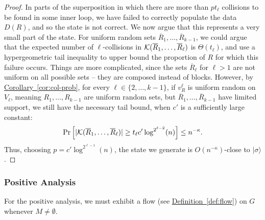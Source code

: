 \documentclass{theoretics}
\newcommand{\cor}[1]{\hyperref[cor:#1]{Corollary~\ref*{cor:#1}}}
\newcommand{\defin}[1]{\hyperref[def:#1]{Definition~\ref*{def:#1}}}
\def\ket#1{{\lvert}#1\rangle}
\renewcommand{\>}{\rangle}
\newcommand{\<}{\langle}
\renewcommand{\(}{\left(}
\renewcommand{\)}{\right)}
\begin{document}
\begin{proof}
In parts of the superposition in which there are more than $pt_{\ell}$ collisions to be found in some inner loop, we have failed to correctly populate the data $D(R)$, and so the state is not correct. We now argue that this represents a very small part of the state. For uniform random sets $\overline{R}_1,\dots,\overline{R}_{k-1}$, we could argue that the expected number of $\ell$-collisions in ${\cal K}(\overline{R}_1,\dots,\overline{R}_{\ell})$ is $\Theta(t_{\ell})$, and use a hypergeometric tail inequality to upper bound the proportion of $R$ for which this failure occurs. Things are more complicated, since the sets $\overline{R}_{\ell}$ for $\ell>1$ are not uniform on all possible sets -- they are composed instead of blocks. However, by \cor{col-prob}, for every $\ell\in \{2,\dots,k-1\}$, if $v_R^{\ell}$ is uniform random on $V_{\ell}$, meaning $R_1,\dots,R_{k-1}$ are uniform random sets, but $\overline{R}_1,\dots,\overline{R}_{k-1}$ have limited support, we still have the necessary tail bound, when $c'$ is a sufficiently large constant: 
	$$\Pr\left[|{\cal K}(\overline{R}_1,\dots,\overline{R}_{\ell})|\geq t_{\ell}c'\log^{2^{\ell-2}}(n)\right]\leq n^{-\kappa}.$$
Thus, choosing $p=c'\log^{2^{\ell-1}}(n)$, the state we generate is $O(n^{-\kappa})$-close to $\ket{\sigma}$.
\end{proof}


 \subsubsection{Positive Analysis}

For the positive analysis, we must exhibit a flow (see \defin{flow}) on $G$ whenever $M\neq \emptyset$. 
\end{document}
